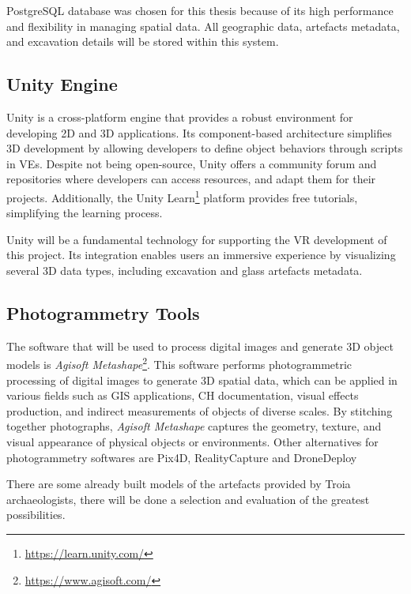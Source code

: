 PostgreSQL database was chosen for this thesis because of its high performance and flexibility in managing spatial data. All geographic data, artefacts metadata, and excavation details will be stored within this system.


\subsection{Unity Engine}
\label{sec:unity_description} 

Unity is a cross-platform engine that provides a robust environment for developing \gls{2D} and \gls{3D} applications. 
Its component-based architecture simplifies \gls{3D} development by allowing developers to define object behaviors through scripts in \glspl{VE}.
Despite not being open-source, Unity offers a community forum and repositories where developers can access resources, and adapt them for their projects.
Additionally, the Unity Learn\footnote{\url{https://learn.unity.com/}} platform provides free tutorials, simplifying the learning process.

Unity will be a fundamental technology for supporting the \gls{VR} development of this project. Its integration enables users an immersive experience by visualizing several \gls{3D} data types, including excavation and glass artefacts metadata. 


\subsection{Photogrammetry Tools}
\label{sec:photogrammetry_tool} 

The software that will be used to process digital images and generate \gls{3D} object models is \textit{Agisoft Metashape}\footnote{\url{https://www.agisoft.com/}}.
This software performs photogrammetric processing of digital images to generate \gls{3D} spatial data, which can be applied in various fields such as \gls{GIS} applications, \gls{CH} documentation, visual effects production, and indirect measurements of objects of diverse scales. 
By stitching together photographs, \textit{Agisoft Metashape} captures the geometry, texture, and visual appearance of physical objects or environments.
Other alternatives for photogrammetry softwares are Pix4D, RealityCapture and DroneDeploy

There are some already built models of the artefacts provided by Troia archaeologists, there will be done a selection and evaluation of the greatest possibilities.


